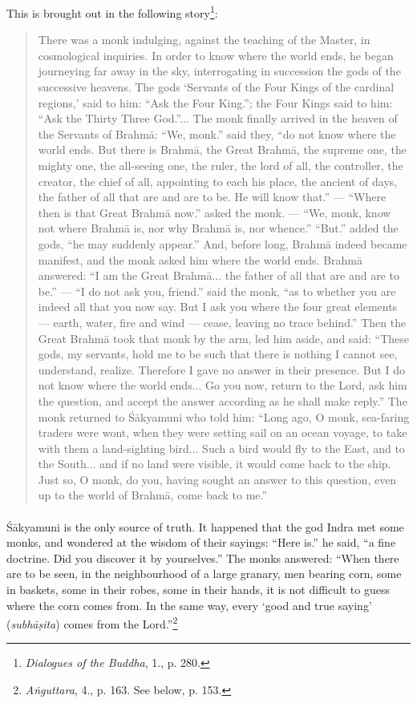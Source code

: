 \documentclass[a4paper, 11pt, oneside, english]{article}
\begin{document}
This is brought out in the following story\footnote{\emph{Dialogues of the Buddha}, 1., p. 280.}:
\begin{quotation}
\small
There was a monk indulging, against the teaching of the Master, in cosmological inquiries. In order to know where the world ends, he began journeying far away in the sky, interrogating in succession the gods of the successive heavens. The gods `Servants of the Four Kings of the cardinal regions,' said to him: ``Ask the Four King.''; the Four Kings said to him: ``Ask the Thirty Three God.''... The monk finally arrived in the heaven of the Servants of Brahmā: ``We, monk.'' said they, ``do not know where the world ends. But there is Brahmā, the Great Brahmā, the supreme one, the mighty one, the all-seeing one, the ruler, the lord of all, the controller, the creator, the chief of all, appointing to each his place, the ancient of days, the father of all that are and are to be. He will know that.'' --- ``Where then is that Great Brahmā now.'' asked the monk. --- ``We, monk, know not where Brahmā is, nor why Brahmā is, nor whence.'' ``But.'' added the gods, ``he may suddenly appear.'' And, before long, Brahmā indeed became manifest, and the monk asked him where the world ends. Brahmā answered: ``I am the Great Brahmā... the father of all that are and are to be.'' --- ``I do not ask you, friend.'' said the monk, ``as to whether you are indeed all that you now say. But I ask you where the four great elements --- earth, water, fire and wind --- cease, leaving no trace behind.'' Then the Great Brahmā took that monk by the arm, led him aside, and said: ``These gods, my servants, hold me to be such that there is nothing I cannot see, understand, realize. Therefore I gave no answer in their presence. But I do not know where the world ends... Go you now, return to the Lord, ask him the question, and accept the answer according as he shall make reply.'' The monk returned to Śākyamuni who told him: ``Long ago, O monk, sea-faring traders were wont, when they were setting sail on an ocean voyage, to take with them a land-sighting bird... Such a bird would fly to the East, and to the South... and if no land were visible, it would come back to the ship. Just so, O monk, do you, having sought an answer to this question, even up to the world of Brahmā, come back to me.''
\end{quotation}
\paragraph{}
Śākyamuni is the only source of truth. It happened that the god Indra met some monks, and wondered at the wisdom of their sayings: ``Here is.'' he said, ``a fine doctrine. Did you discover it by yourselves.'' The monks answered: ``When there are to be seen, in the neighbourhood of a large granary, men bearing corn, some in baskets, some in their robes, some in their hands, it is not difficult to guess where the corn comes from. In the same way, every `good and true saying' (\emph{subhāṣita}) comes from the Lord.''\footnote{\emph{Aṅguttara}, 4., p. 163. See below, p. 153.}
\clearpage
\end{document}

